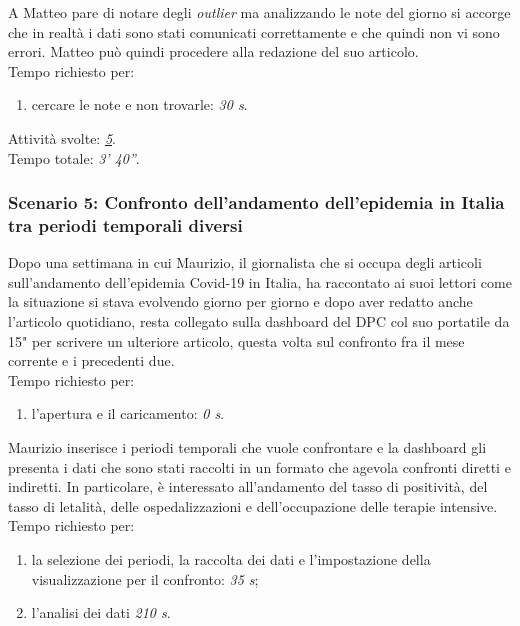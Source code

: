 A Matteo pare di notare degli \textit{outlier} ma analizzando le note del giorno si accorge che in realtà i dati sono stati comunicati correttamente e che quindi non vi sono errori. Matteo può quindi procedere alla redazione del suo articolo.\\
Tempo richiesto per:
\begin{enumerate}
    \item cercare le note e non trovarle: \textit{30 s}.
\end{enumerate}\noindent

Attività svolte: \hyperref[itm:5]{\textit{5}}.\\  
Tempo totale: \textit{3' 40''}. 

\subsubsection{Scenario 5: Confronto dell'andamento dell'epidemia in Italia tra periodi temporali diversi}
Dopo una settimana in cui Maurizio, il giornalista che si occupa degli articoli sull'andamento dell'epidemia Covid-19 in Italia, ha raccontato ai suoi lettori come la situazione si stava evolvendo giorno per giorno e dopo aver redatto anche l'articolo quotidiano, resta collegato sulla dashboard del DPC col suo portatile da 15" per scrivere un ulteriore articolo, questa volta sul confronto fra il mese corrente e i precedenti due.\\
Tempo richiesto per:
\begin{enumerate}
    \item l'apertura e il caricamento: \textit{0 s}.
\end{enumerate}\noindent

Maurizio inserisce i periodi temporali che vuole confrontare e la dashboard gli presenta i dati che sono stati raccolti in un formato che agevola confronti diretti e indiretti. In particolare, è interessato all'andamento del tasso di positività, del tasso di letalità, delle ospedalizzazioni e dell'occupazione delle terapie intensive.\\
Tempo richiesto per:
\begin{enumerate}
    \item la selezione dei periodi, la raccolta dei dati e l'impostazione della visualizzazione per il confronto: \textit{35 s};
    \item l'analisi dei dati \textit{210 s}.
\end{enumerate}\noindent

